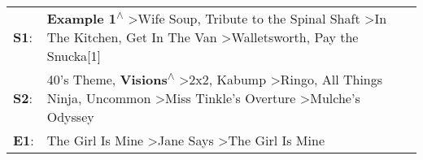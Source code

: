 \begin{supertabular}{p{0.03\textwidth}p{0.92\textwidth}}
 \textbf{S1}:  &                                                               \textbf{Example 1\textsuperscript{$\wedge$}} \textgreater \enspace Wife Soup\textsuperscript{}, \enspace Tribute to the Spinal Shaft\textsuperscript{} \textgreater \enspace In The Kitchen\textsuperscript{}, \enspace Get In The Van\textsuperscript{} \textgreater \enspace Walletsworth\textsuperscript{}, \enspace Pay the Snucka[1]\textsuperscript{}  \enspace  \\
 \textbf{S2}:  &  40's Theme\textsuperscript{}, \enspace \textbf{Visions\textsuperscript{$\wedge$}} \textgreater \enspace 2x2\textsuperscript{}, \enspace Kabump\textsuperscript{} \textgreater \enspace Ringo\textsuperscript{}, \enspace All Things Ninja\textsuperscript{}, \enspace Uncommon\textsuperscript{} \textgreater \enspace Miss Tinkle's Overture\textsuperscript{} \textgreater \enspace Mulche's Odyssey\textsuperscript{}  \enspace  \\
 \textbf{E1}:  &                                                                                                                                                                                                                                                                             The Girl Is Mine\textsuperscript{} \textgreater \enspace Jane Says\textsuperscript{} \textgreater \enspace The Girl Is Mine\textsuperscript{}  \enspace  \\
\end{supertabular}
